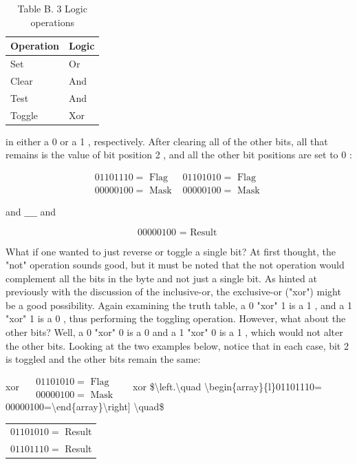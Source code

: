 \documentclass[10pt]{book}
\begin{document}
\begin{table}[htbp]
\begin{center}
\captionsetup{labelformat=empty}
\caption{Table B. 3 Logic operations}
\begin{tabular}{|l|l|}
\hline
Operation & Logic \\
\hline
Set & Or \\
\hline
Clear & And \\
\hline
Test & And \\
\hline
Toggle & Xor \\
\hline
\end{tabular}
\end{center}
\end{table}

in either a 0 or a 1 , respectively. After clearing all of the other bits, all that remains is the value of bit position 2 , and all the other bit positions are set to 0 :

$$
\begin{array}{ll}
01101110=\text { Flag } & 01101010=\text { Flag } \\
00000100=\text { Mask } & 00000100=\text { Mask }
\end{array}
$$

and $\_\_\_\_$ and

$$
00000100 \text { = Result }
$$

What if one wanted to just reverse or toggle a single bit? At first thought, the "not" operation sounds good, but it must be noted that the not operation would complement all the bits in the byte and not just a single bit. As hinted at previously with the discussion of the inclusive-or, the exclusive-or ("xor") might be a good possibility. Again examining the truth table, a 0 "xor" 1 is a 1 , and a 1 "xor" 1 is a 0 , thus performing the toggling operation. However, what about the other bits? Well, a 0 "xor" 0 is a 0 and a 1 "xor" 0 is a 1 , which would not alter the other bits. Looking at the two examples below, notice that in each case, bit 2 is toggled and the other bits remain the same:

xor $\quad \begin{array}{l}01101010=\text { Flag } \\
00000100=\text { Mask }\end{array} \quad$ xor \$\textbackslash left.\textbackslash quad \textbackslash begin\{array\}\{l\}01101110= \\


00000100=\textbackslash end\{array\}\textbackslash right] \textbackslash quad\$\begin{tabular}{c}
$01101010=$ Result \\
$01101110=$ Result \\
\end{tabular}
\end{document}
